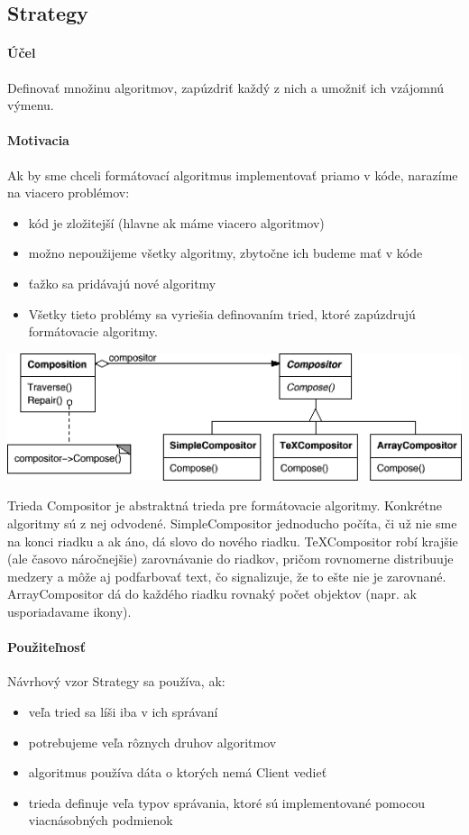 	\subsection{Strategy}
		\paragraph{Účel}
			Definovať množinu algoritmov, zapúzdriť každý z nich a umožniť ich vzájomnú výmenu.
		\paragraph{Motivacia}
			Ak by sme chceli formátovací algoritmus implementovať priamo v kóde, narazíme na viacero problémov:
				\begin{itemize}
					\item kód je zložitejší (hlavne ak máme viacero algoritmov)
					\item možno nepoužijeme všetky algoritmy, zbytočne ich budeme mať v kóde
					\item ťažko sa pridávajú nové algoritmy
					\item Všetky tieto problémy sa vyriešia definovaním tried, ktoré zapúzdrujú formátovacie algoritmy.\\
				\end{itemize}

				\includegraphics[width=.9\textwidth]{images/strategy1}

		Trieda Compositor je abstraktná trieda pre formátovacie algoritmy. Konkrétne algoritmy sú z nej odvodené. SimpleCompositor jednoducho počíta, či už nie sme na konci riadku a ak áno, dá slovo do nového riadku. TeXCompositor robí krajšie (ale časovo náročnejšie) zarovnávanie do riadkov, pričom rovnomerne distribuuje medzery a môže aj podfarbovať text, čo signalizuje, že to ešte nie je zarovnané. ArrayCompositor dá do každého riadku rovnaký počet objektov (napr. ak usporiadavame ikony).


		\paragraph{Použiteľnosť}
			Návrhový vzor Strategy sa používa, ak:
			\begin{itemize}
				\item veľa tried sa líši iba v ich správaní
				\item potrebujeme veľa rôznych druhov algoritmov
				\item algoritmus používa dáta o ktorých nemá Client vedieť
				\item trieda definuje veľa typov správania, ktoré sú implementované pomocou viacnásobných podmienok
			\end{itemize}
